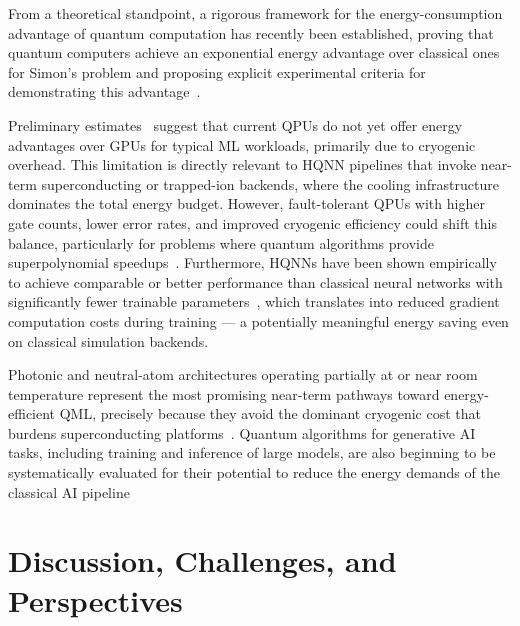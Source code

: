 \documentclass[aps,10pt,groupedaddress,prx,superscriptaddress,twocolumn,balancelastpage, tightenlines]{revtex4-2}
\theoremstyle{plain}  %
\begin{document}
From a theoretical standpoint, a rigorous framework for the energy-consumption advantage of quantum computation has recently been established, proving that quantum computers achieve an exponential energy advantage over classical ones for Simon's problem and proposing explicit experimental criteria for demonstrating this advantage~\cite{meier_energy-consumption_2025}. 

Preliminary estimates~\cite{jaschke2023quantum, fellous-asiani_optimizing_2023} suggest that current QPUs do not yet offer energy advantages over GPUs for typical ML workloads, primarily due to cryogenic overhead. This limitation is directly relevant to HQNN pipelines that invoke near-term superconducting or trapped-ion backends, where the cooling infrastructure dominates the total energy budget. However, fault-tolerant QPUs with higher gate counts, lower error rates, and improved cryogenic efficiency could shift this balance, particularly for problems where quantum algorithms provide superpolynomial speedups~\cite{meier_energy-consumption_2025}. Furthermore, HQNNs have been shown empirically to achieve comparable or better performance than classical neural networks with significantly fewer trainable parameters~\cite{bischof_hybrid_2025}, which translates into reduced gradient computation costs during training — a potentially meaningful energy saving even on classical simulation backends.

Photonic and neutral-atom architectures operating partially at or near room temperature represent the most promising near-term pathways toward energy-efficient QML, precisely because they avoid the dominant cryogenic cost that burdens superconducting platforms~\cite{soret_quantum_2026}. Quantum algorithms for generative \gls{AI} tasks, including training and inference of large models, are also beginning to be systematically evaluated for their potential to reduce the energy demands of the classical \gls{AI} pipeline~\cite{flother_accelerating_2025}



\section{Discussion, Challenges, and Perspectives}
    
    \label{sec:discussion}
\end{document}
